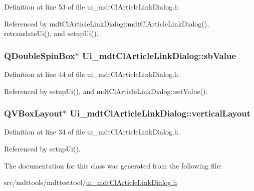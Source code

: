 Definition at line 53 of file ui\-\_\-mdt\-Cl\-Article\-Link\-Dialog.\-h.



Referenced by mdt\-Cl\-Article\-Link\-Dialog\-::mdt\-Cl\-Article\-Link\-Dialog(), retranslate\-Ui(), and setup\-Ui().

\hypertarget{class_ui__mdt_cl_article_link_dialog_a00018187b69f670a46eee24b810eb27c}{
\subsubsection[{sb\-Value}]{\setlength{\rightskip}{0pt plus 5cm}Q\-Double\-Spin\-Box$\ast$ Ui\-\_\-mdt\-Cl\-Article\-Link\-Dialog\-::sb\-Value}}\label{class_ui__mdt_cl_article_link_dialog_a00018187b69f670a46eee24b810eb27c}


Definition at line 44 of file ui\-\_\-mdt\-Cl\-Article\-Link\-Dialog.\-h.



Referenced by setup\-Ui(), and mdt\-Cl\-Article\-Link\-Dialog\-::set\-Value().

\hypertarget{class_ui__mdt_cl_article_link_dialog_a2b08d416f5daa92e6eb0fc87ec1fe3f6}{
\subsubsection[{vertical\-Layout}]{\setlength{\rightskip}{0pt plus 5cm}Q\-V\-Box\-Layout$\ast$ Ui\-\_\-mdt\-Cl\-Article\-Link\-Dialog\-::vertical\-Layout}}\label{class_ui__mdt_cl_article_link_dialog_a2b08d416f5daa92e6eb0fc87ec1fe3f6}


Definition at line 34 of file ui\-\_\-mdt\-Cl\-Article\-Link\-Dialog.\-h.



Referenced by setup\-Ui().



The documentation for this class was generated from the following file\-:\begin{DoxyCompactItemize}
\item 
src/mdttools/mdttesttool/\hyperlink{ui__mdt_cl_article_link_dialog_8h}{ui\-\_\-mdt\-Cl\-Article\-Link\-Dialog.\-h}\end{DoxyCompactItemize}
